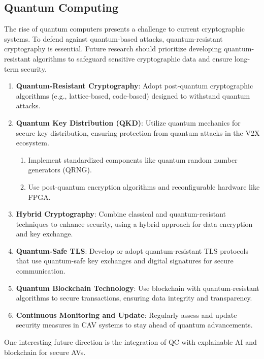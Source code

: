 \subsection{Quantum Computing}\label{subsec:quantum-computing}
The rise of quantum computers presents a challenge to current cryptographic systems.
To defend against quantum-based attacks, quantum-resistant cryptography is essential.
Future research should prioritize
developing quantum-resistant algorithms to safeguard sensitive cryptographic data and ensure long-term security\cite{ahmad2023machine, admass2023cyber}.

\begin{enumerate}
    \item \textbf{Quantum-Resistant Cryptography}:
    Adopt post-quantum cryptographic algorithms (e.g., lattice-based, code-based) designed to withstand quantum attacks.
    \item \textbf{Quantum Key Distribution (QKD)}: Utilize quantum mechanics for secure key distribution,
    ensuring protection from quantum attacks in the V2X ecosystem.
    \begin{enumerate}
        \item Implement standardized components like quantum random number generators (QRNG).
        \item Use post-quantum encryption algorithms and reconfigurable hardware like FPGA.
    \end{enumerate}
    \item \textbf{Hybrid Cryptography}: Combine classical and quantum-resistant techniques to enhance security,
    using a hybrid approach for data encryption and key exchange.
    \item \textbf{Quantum-Safe TLS}:
    Develop or adopt quantum-resistant TLS protocols
    that use quantum-safe key exchanges and digital signatures for secure communication.
    \item \textbf{Quantum Blockchain Technology}: Use blockchain with quantum-resistant algorithms to secure transactions,
    ensuring data integrity and transparency.
    \item \textbf{Continuous Monitoring and Update}:
    Regularly assess and update security measures in CAV systems to stay ahead of quantum advancements.
\end{enumerate}

One interesting future direction is the integration of QC with explainable
AI and blockchain for secure AVs\cite{bendiab2023autonomous}.


